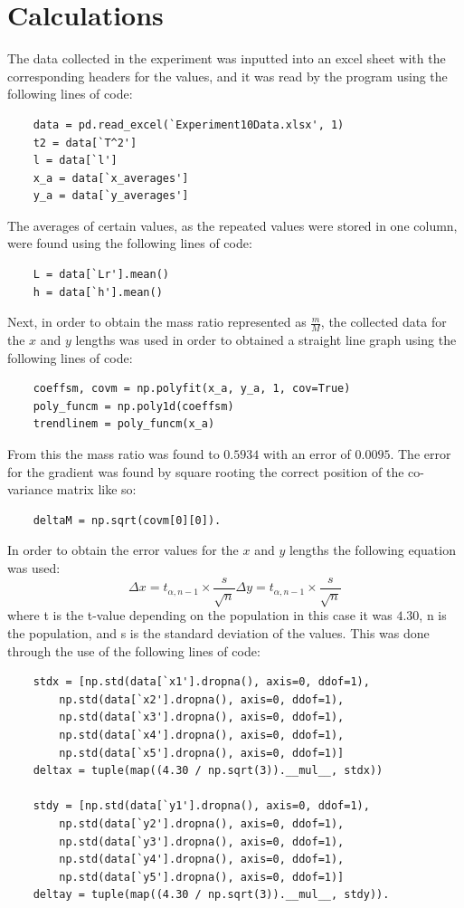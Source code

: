 \documentclass[12pt, a4paper]{article}
\begin{document}
\section*{Calculations}
The data collected in the experiment was inputted into an excel sheet with the corresponding headers for the values, and it was read by the program using the following lines of code:
\begin{verbatim}
    data = pd.read_excel(`Experiment10Data.xlsx', 1)
    t2 = data[`T^2']
    l = data[`l']
    x_a = data[`x_averages']
    y_a = data[`y_averages']
\end{verbatim}
The averages of certain values, as the repeated values were stored in one column, were found using the following lines of code:
\begin{verbatim}
    L = data[`Lr'].mean()
    h = data[`h'].mean()
\end{verbatim}
Next, in order to obtain the mass ratio represented as $\frac{m}{M}$, the collected data for the $x$ and $y$ lengths was used in order to obtained a straight line graph using the following lines of code:
\begin{verbatim}
    coeffsm, covm = np.polyfit(x_a, y_a, 1, cov=True)
    poly_funcm = np.poly1d(coeffsm)
    trendlinem = poly_funcm(x_a)
\end{verbatim}
From this the mass ratio was found to $0.5934$ with an error of $0.0095$. The error for the gradient was found by square rooting the correct position of the co-variance matrix like so:
\begin{verbatim}
    deltaM = np.sqrt(covm[0][0]).
\end{verbatim}
In order to obtain the error values for the $x$ and $y$ lengths the following equation was used:
\begin{equation}\label{x,y error}
    \Delta x = t_{\alpha, n-1} \times \frac{s}{\sqrt{n}}
    \Delta y = t_{\alpha, n-1} \times \frac{s}{\sqrt{n}}
\end{equation}
where t is the t-value depending on the population in this case it was $4.30$, n is the population, and s is the standard deviation of the values. This was done through the use of the following lines of code:
\begin{verbatim}
    stdx = [np.std(data[`x1'].dropna(), axis=0, ddof=1), 
        np.std(data[`x2'].dropna(), axis=0, ddof=1),
        np.std(data[`x3'].dropna(), axis=0, ddof=1), 
        np.std(data[`x4'].dropna(), axis=0, ddof=1),
        np.std(data[`x5'].dropna(), axis=0, ddof=1)]
    deltax = tuple(map((4.30 / np.sqrt(3)).__mul__, stdx))
 
    stdy = [np.std(data[`y1'].dropna(), axis=0, ddof=1), 
        np.std(data[`y2'].dropna(), axis=0, ddof=1),
        np.std(data[`y3'].dropna(), axis=0, ddof=1), 
        np.std(data[`y4'].dropna(), axis=0, ddof=1),
        np.std(data[`y5'].dropna(), axis=0, ddof=1)]
    deltay = tuple(map((4.30 / np.sqrt(3)).__mul__, stdy)).
\end{verbatim}
\end{document}
